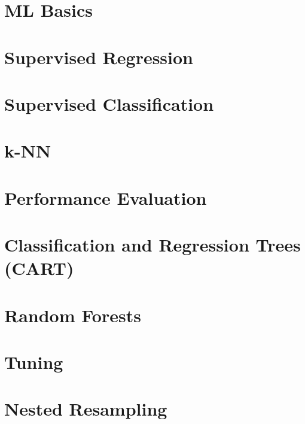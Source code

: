\documentclass[11pt,compress]{beamer}
\begin{document}


\section{ML Basics}


\section{Supervised Regression}


\section{Supervised Classification}


\section{k-NN}


\section{Performance Evaluation}


\section{Classification and Regression Trees (CART)}


\section{Random Forests}


\section{Tuning}


\section{Nested Resampling}

\end{document}
